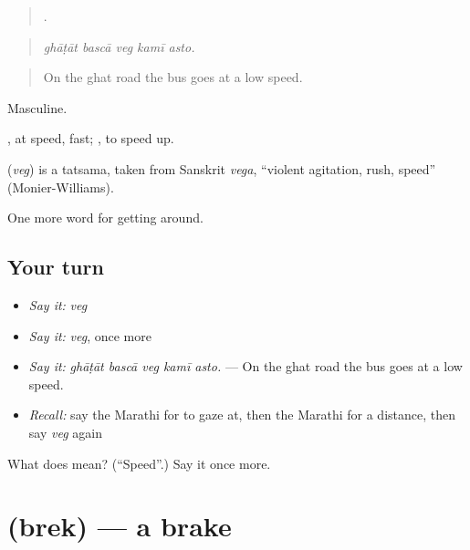 \begin{quote}
    .
\end{quote}

\begin{quote}
\emph{ghāṭāt bascā veg kamī asto.}
\end{quote}

\begin{quote}
On the ghat road the bus goes at a low speed.
\end{quote}

Masculine.

, at speed, fast;  , to speed up.

\begin{cousinweb}
\textbf{} (\emph{veg}) is a tatsama, taken from Sanskrit \emph{vega}, \textquotedblleft{}violent agitation, rush, speed\textquotedblright{} (Monier-Williams).
\end{cousinweb}

\begin{grammarlens}[title={What you've built}]
One more word for getting around.
\end{grammarlens}

\subsection*{Your turn}
\begin{itemize}
\raggedright
  \item \emph{Say it:} \emph{veg}
  \item \emph{Say it:} \emph{veg}, once more
  \item \emph{Say it:} \emph{ghāṭāt bascā veg kamī asto.} — On the ghat road the bus goes at a low speed.
  \item \emph{Recall:} say the Marathi for to gaze at, then the Marathi for a distance, then say \emph{veg} again
\end{itemize}

\begin{tcolorbox}[breakable,colback=teal!4,colframe=teal!35!black,title={Before you move on}]
What does  mean? (\textquotedblleft{}Speed\textquotedblright{}.) Say it once more.
\end{tcolorbox}
\section[\texorpdfstring{\mr{ब्रेक} (brek)}{ब्रेक (brek)}]{ (brek) — a brake}

